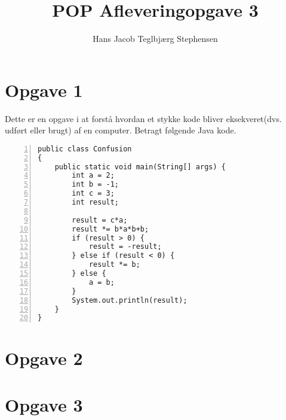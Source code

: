 \documentclass[a4paper]{article}
\author{Hans Jacob Teglbjærg Stephensen}
\begin{document}
\title{POP Afleveringopgave 3}

\maketitle

\section{Opgave 1}
Dette er en opgave i at forstå hvordan et stykke kode bliver eksekveret(dvs. udført eller brugt) af en computer. Betragt følgende Java kode.

\begin{Verbatim}[numbers=left,numbersep=5pt]
public class Confusion
{
    public static void main(String[] args) {
        int a = 2;
        int b = -1;
        int c = 3;
        int result;

        result = c*a;
        result *= b*a*b+b;
        if (result > 0) {
            result = -result;
        } else if (result < 0) {
            result *= b;    
        } else {
            a = b;
        }
        System.out.println(result);
    }
}
\end{Verbatim}


\section{Opgave 2}

\section{Opgave 3}
\end{document}
